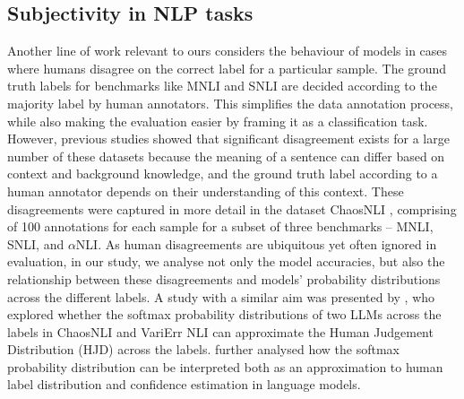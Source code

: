 \subsection{Subjectivity in NLP tasks}
\label{related:subjectivity}
Another line of work relevant to ours considers the behaviour of models in cases where humans disagree on the correct label for a particular sample. 
The ground truth labels for benchmarks like MNLI and SNLI are decided according to the majority label by human annotators. 
This simplifies the data annotation process, while also making the evaluation easier by framing it as a classification task. 
However, previous studies \citep{pavlick-kwiatkowski-2019-inherent, nie-etal-2020-learn} showed that significant disagreement exists for a large number of these datasets because the meaning of a sentence can differ based on context and background knowledge, and the ground truth label according to a human annotator depends on their understanding of this context. 
These disagreements were captured in more detail in the dataset ChaosNLI \citep{nie-etal-2020-learn}, comprising of 100 annotations for each sample for a subset of three benchmarks -- MNLI, SNLI, and $\alpha$NLI.
As human disagreements are ubiquitous yet often ignored in evaluation, in our study, we analyse not only the model accuracies, but also the relationship between these disagreements and models' probability distributions across the different labels.
A study with a similar aim was presented by \citet{chen2024seeingbig}, who explored whether the softmax probability distributions of two LLMs across the labels in ChaosNLI and VariErr NLI \citep{weber-genzel-etal-2024-varierr} can approximate the Human Judgement Distribution (HJD) across the labels. 
\citet{baan-etal-2024-interpreting} further analysed how the softmax probability distribution can be interpreted both as an approximation to human label distribution and confidence estimation in language models.
